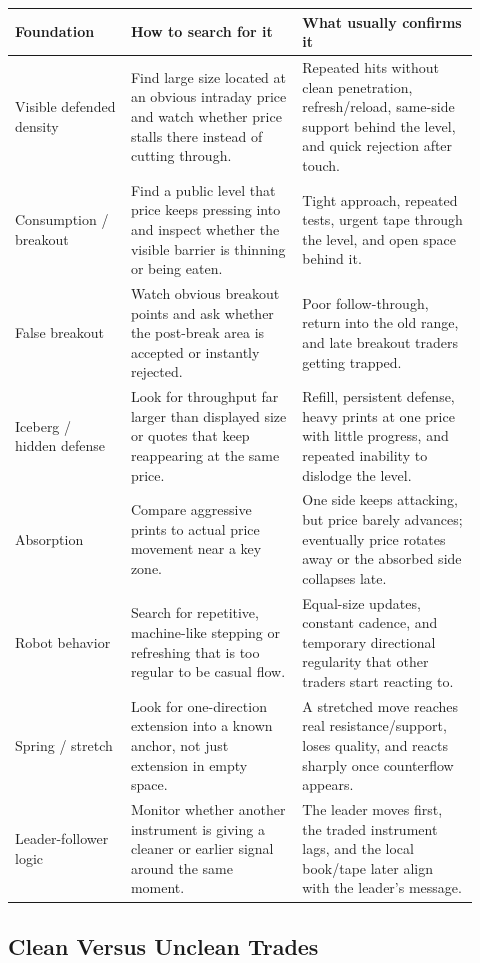 \begin{longtable}{p{0.23\linewidth}p{0.34\linewidth}p{0.35\linewidth}}
\toprule
\textbf{Foundation} & \textbf{How to search for it} & \textbf{What usually confirms it} \\
\midrule
Visible defended density & Find large size located at an obvious intraday price and watch whether price stalls there instead of cutting through. & Repeated hits without clean penetration, refresh/reload, same-side support behind the level, and quick rejection after touch. \\
Consumption / breakout & Find a public level that price keeps pressing into and inspect whether the visible barrier is thinning or being eaten. & Tight approach, repeated tests, urgent tape through the level, and open space behind it. \\
False breakout & Watch obvious breakout points and ask whether the post-break area is accepted or instantly rejected. & Poor follow-through, return into the old range, and late breakout traders getting trapped. \\
Iceberg / hidden defense & Look for throughput far larger than displayed size or quotes that keep reappearing at the same price. & Refill, persistent defense, heavy prints at one price with little progress, and repeated inability to dislodge the level. \\
Absorption & Compare aggressive prints to actual price movement near a key zone. & One side keeps attacking, but price barely advances; eventually price rotates away or the absorbed side collapses late. \\
Robot behavior & Search for repetitive, machine-like stepping or refreshing that is too regular to be casual flow. & Equal-size updates, constant cadence, and temporary directional regularity that other traders start reacting to. \\
Spring / stretch & Look for one-direction extension into a known anchor, not just extension in empty space. & A stretched move reaches real resistance/support, loses quality, and reacts sharply once counterflow appears. \\
Leader-follower logic & Monitor whether another instrument is giving a cleaner or earlier signal around the same moment. & The leader moves first, the traded instrument lags, and the local book/tape later align with the leader's message. \\
\bottomrule
\end{longtable}

\subsection{Clean Versus Unclean Trades}

